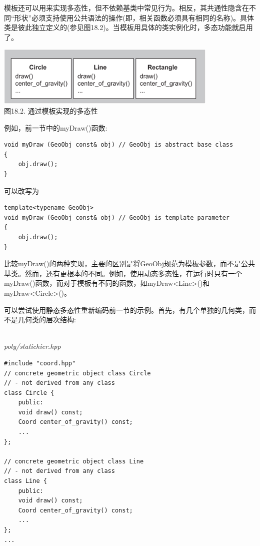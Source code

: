 
模板还可以用来实现多态性，但不依赖基类中常见行为。相反，其共通性隐含在不同“形状”必须支持使用公共语法的操作(即，相关函数必须具有相同的名称)。具体类是彼此独立定义的(参见图18.2)。当模板用具体的类实例化时，多态功能就启用了。

\begin{center}
\includegraphics[width=0.8\textwidth]{content/3/chapter18/images/2.png} \\
图18.2. 通过模板实现的多态性
\end{center}

例如，前一节中的myDraw()函数:

\begin{lstlisting}[style=styleCXX]
void myDraw (GeoObj const& obj) // GeoObj is abstract base class
{
	obj.draw();
}
\end{lstlisting}

可以改写为

\begin{lstlisting}[style=styleCXX]
template<typename GeoObj>
void myDraw (GeoObj const& obj) // GeoObj is template parameter
{
	obj.draw();
}
\end{lstlisting}

比较myDraw()的两种实现，主要的区别是将GeoObj规范为模板参数，而不是公共基类。然而，还有更根本的不同。例如，使用动态多态性，在运行时只有一个myDraw()函数，而对于模板有不同的函数，如myDraw<Line>()和myDraw<Circle>()。

可以尝试使用静态多态性重新编码前一节的示例。首先，有几个单独的几何类，而不是几何类的层次结构:

\hspace*{\fill} \\ %
\noindent
\textit{poly/statichier.hpp}
\begin{lstlisting}[style=styleCXX]
#include "coord.hpp"
// concrete geometric object class Circle
// - not derived from any class
class Circle {
	public:
	void draw() const;
	Coord center_of_gravity() const;
	...
};

// concrete geometric object class Line
// - not derived from any class
class Line {
	public:
	void draw() const;
	Coord center_of_gravity() const;
	...
};
...
\end{lstlisting}

